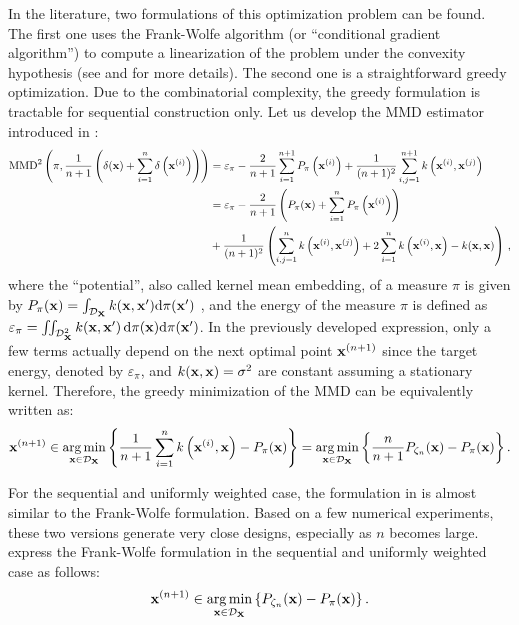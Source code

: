 In the literature, two formulations of this optimization problem can be found. 
The first one uses the Frank-Wolfe algorithm (or ``conditional gradient algorithm'') to compute a linearization of the problem under the convexity hypothesis (see \citealp{lacoste_2015} and \citealp{briol_2015} for more details). 
The second one is a straightforward greedy optimization. Due to the combinatorial complexity, the greedy formulation is tractable for sequential construction only. 
Let us develop the MMD estimator introduced in :
\begin{subequations}
\begin{align}
    \mathrm{MMD}^2\left(\pi, \frac{1}{n+1} \left(\delta({\bf x}) + \sum_{i=1}^{n} \delta\left({\bf x}^{(i)}\right)\right)\right)
    &= \varepsilon_\pi - \frac{2}{n+1} \sum_{i=1}^{n+1} P_{\pi}\left({\bf x}^{(i)}\right) + \frac{1}{(n+1)^2} \sum_{i,j=1}^{n+1} k\left({\bf x}^{(i)}, {\bf x}^{(j)}\right)\\
    &= \varepsilon_\pi - \frac{2}{n+1} \left(P_\pi({\bf x}) + \sum_{i=1}^n P_{\pi}\left({\bf x}^{(i)}\right)\right)\\ &+ \frac{1}{(n+1)^2} \left(\sum_{i,j=1}^n k\left({\bf x}^{(i)}, {\bf x}^{(j)}\right) + 2\sum_{i=1}^n k\left({\bf x}^{(i)}, {\bf x}\right) - k({\bf x}, {\bf x}) \right)\, ,
\end{align}
\end{subequations}
where the ``potential'', also called kernel mean embedding, of a measure $\pi$ is given by $P_{\pi}({\bf x}) = \int_{\mathcal{D}_{{\bf X}}} k({\bf x}, {\bf x}') \mathrm{d} \pi({\bf x}')$
, and the energy of the measure $\pi$ is defined as $\varepsilon_\pi = \iint_{\mathcal{D}_{{\bf X}}^2} k({\bf x}, {\bf x}')\, \mathrm{d}\pi({\bf x}) \mathrm{d}\pi({\bf x}')$.
In the previously developed expression, only a few terms actually depend on the next optimal point ${\bf x}^{(n+1)}$ since the target energy, denoted by $\varepsilon_\pi$, and $k({\bf x}, {\bf x})=\sigma^2$ are constant assuming a stationary kernel. 
Therefore, the greedy minimization of the MMD can be equivalently written as: 
\begin{equation}
    {\bf x}^{(n+1)} \in \operatorname*{arg\,min}_{{\bf x} \in \mathcal{D}_{{\bf X}}} \left\{ \frac{1}{n+1} \sum_{i=1}^n k\left({\bf x}^{(i)}, {\bf x}\right) - P_\pi({\bf x}) \right\} = \operatorname*{arg\,min}_{{\bf x} \in \mathcal{D}_{{\bf X}}} \left\{ \frac{n}{n+1} P_{\zeta_n}({\bf x}) - P_{\pi}({\bf x})\right\}.
    \label{eq:greedy_formulation}
\end{equation}

\medskip
\begin{remark}
For the sequential and uniformly weighted case, the formulation in  is almost similar to the Frank-Wolfe formulation. 
Based on a few numerical experiments, these two versions generate very close designs, especially as $n$ becomes large. 
\cite{pronzato_rendas_2021} express the Frank-Wolfe formulation in the sequential and uniformly weighted case as follows:
\begin{align}
   {\bf x}^{(n+1)} \in \operatorname*{arg\,min}_{{\bf x} \in \mathcal{D}_{{\bf X}}} \left\{P_{\zeta_n}({\bf x}) - P_{\pi}({\bf x})\right\}.
   \label{eq:kh_criterion}
\end{align}
\end{remark}
\smallskip

